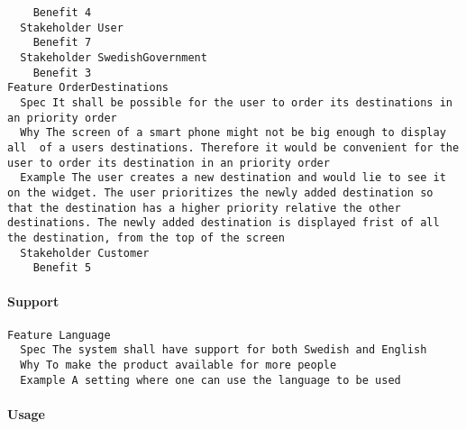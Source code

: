 \begin{lstlisting}
    Benefit 4
  Stakeholder User
    Benefit 7
  Stakeholder SwedishGovernment
    Benefit 3
Feature OrderDestinations
  Spec It shall be possible for the user to order its destinations in an priority order
  Why The screen of a smart phone might not be big enough to display all  of a users destinations. Therefore it would be convenient for the user to order its destination in an priority order
  Example The user creates a new destination and would lie to see it on the widget. The user prioritizes the newly added destination so that the destination has a higher priority relative the other destinations. The newly added destination is displayed frist of all the destination, from the top of the screen
  Stakeholder Customer
    Benefit 5

\end{lstlisting}
    
        
       \paragraph{Support}


\begin{lstlisting}
Feature Language
  Spec The system shall have support for both Swedish and English
  Why To make the product available for more people
  Example A setting where one can use the language to be used

\end{lstlisting}
    
        
       \paragraph{Usage}


